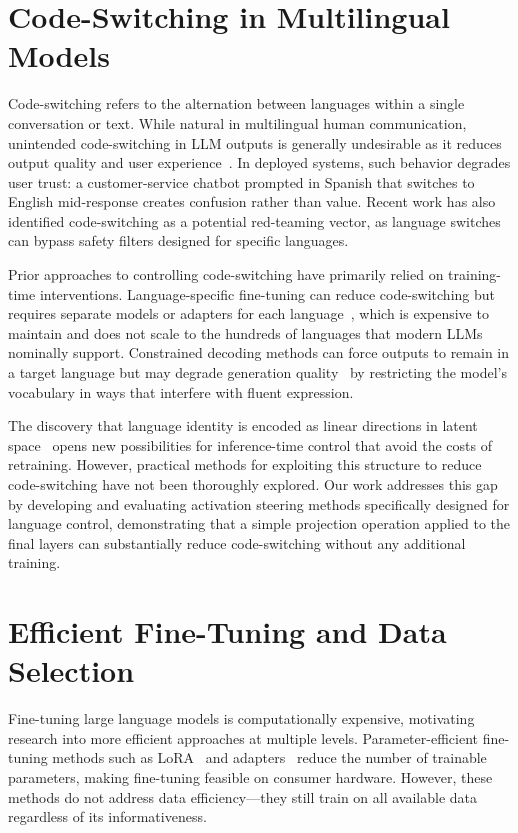 \section{Code-Switching in Multilingual Models}

Code-switching refers to the alternation between languages within a single conversation or text. While natural in multilingual human communication, unintended code-switching in LLM outputs is generally undesirable as it reduces output quality and user experience~\cite{etxaniz2024multilingual}. In deployed systems, such behavior degrades user trust: a customer-service chatbot prompted in Spanish that switches to English mid-response creates confusion rather than value. Recent work has also identified code-switching as a potential red-teaming vector, as language switches can bypass safety filters designed for specific languages.

Prior approaches to controlling code-switching have primarily relied on training-time interventions. Language-specific fine-tuning can reduce code-switching but requires separate models or adapters for each language~\cite{pfeiffer2020adapterhub}, which is expensive to maintain and does not scale to the hundreds of languages that modern LLMs nominally support. Constrained decoding methods can force outputs to remain in a target language but may degrade generation quality~\cite{post2018fast} by restricting the model's vocabulary in ways that interfere with fluent expression.

The discovery that language identity is encoded as linear directions in latent space~\cite{wendler2024llamas} opens new possibilities for inference-time control that avoid the costs of retraining. However, practical methods for exploiting this structure to reduce code-switching have not been thoroughly explored. Our work addresses this gap by developing and evaluating activation steering methods specifically designed for language control, demonstrating that a simple projection operation applied to the final layers can substantially reduce code-switching without any additional training.

\section{Efficient Fine-Tuning and Data Selection}

Fine-tuning large language models is computationally expensive, motivating research into more efficient approaches at multiple levels. Parameter-efficient fine-tuning methods such as LoRA~\cite{hu2022lora} and adapters~\cite{houlsby2019parameter} reduce the number of trainable parameters, making fine-tuning feasible on consumer hardware. However, these methods do not address data efficiency---they still train on all available data regardless of its informativeness.

